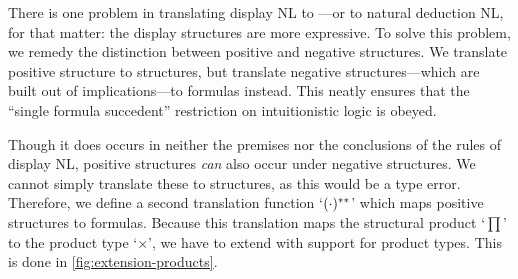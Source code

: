 \documentclass[a4paper]{article}
\begin{document}
There is one problem in translating display NL to \lamET---or to
natural deduction NL, for that matter: the display structures are more
expressive. To solve this problem, we remedy the distinction between
positive and negative structures. We translate positive
structure to structures, but translate negative structures---which are
built out of implications---to formulas instead. This neatly ensures
that the ``single formula succedent'' restriction on intuitionistic
logic is obeyed.

Though it does occurs in neither the premises nor the conclusions of
the rules of display NL, positive structures \emph{can} also occur
under negative structures. We cannot simply translate these to
structures, as this would be a type error. Therefore, we define a
second translation function `$({\cdot})^{**}$' which maps positive structures to
formulas. Because this translation maps the structural product `$\prod$'
to the product type `$\times$', we have to extend \lamET with support
for product types. This is done in \autoref{fig:extension-products}.

\vspace*{1\baselineskip}
\end{document}
